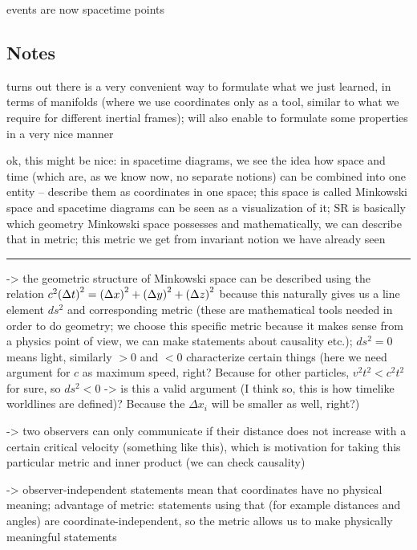 events are now spacetime points




		\subsection{Notes}

turns out there is a very convenient way to formulate what we just learned, in terms of manifolds (where we use coordinates only as a tool, similar to what we require for different inertial frames); will also enable to formulate some properties in a very nice manner

ok, this might be nice: in spacetime diagrams, we see the idea how space and time (which are, as we know now, no separate notions) can be combined into one entity -- describe them as coordinates in one space; this space is called Minkowski space and spacetime diagrams can be seen as a visualization of it; SR is basically which geometry Minkowski space possesses and mathematically, we can describe that in metric; this metric we get from invariant notion we have already seen

\hrule

-> the geometric structure of Minkowski space can be described using the relation $c^2 \qty(\Delta t)^2 = \qty(\Delta x)^2 + \qty(\Delta y)^2 + \qty(\Delta z)^2$ because this naturally gives us a line element $ds^2$ and corresponding metric (these are mathematical tools needed in order to do geometry; we choose this specific metric because it makes sense from a physics point of view, we can make statements about causality etc.); $ds^2 = 0$ means light, similarly $> 0$ and $< 0$ characterize certain things (here we need argument for $c$ as maximum speed, right? Because for other particles, $v^2 t^2 < c^2 t^2$ for sure, so $ds^2 < 0$ -> is this a valid argument (I think so, this is how timelike worldlines are defined)? Because the $\Delta x_i$ will be smaller as well, right?)

-> two observers can only communicate if their distance does not increase with a certain critical velocity (something like this), which is motivation for taking this particular metric and inner product (we can check causality)

-> observer-independent statements mean that coordinates have no physical meaning; advantage of metric: statements using that (for example distances and angles) are coordinate-independent, so the metric allows us to make physically meaningful statements

